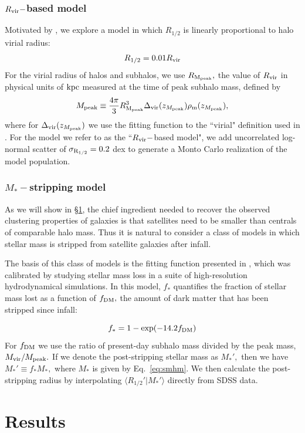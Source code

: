 \documentclass[usenatbib,usegraphicx,letterpaper]{mn2e}
\newcommand{\beq}{\begin{equation}}
\newcommand{\eeq}{\end{equation}}
\newcommand{\rhalf}{R_{1/2}}
\newcommand{\sigmarhalf}{\sigma_{\rm R_{1/2}}}
\newcommand{\mstar}{M_{\ast}}
\newcommand{\mpeak}{M_{\rm peak}}
\newcommand{\zpeak}{z_{M_{\rm peak}}}
\newcommand{\rvir}{R_{\rm vir}}
\newcommand{\rmpeak}{R_{\rm M_{peak}}}
\newcommand{\kpc}{{\rm kpc}}
\begin{document}
\subsubsection{$\rvir-$based model}
\label{subsubsec:rvirmodel}

Motivated by \citet{kravtsov13}, we explore a model in which $\rhalf$ is linearly proportional to halo virial radius:
\beq
\label{eq:fiducial_model}
\rhalf = 0.01\rvir
\eeq
For the virial radius of halos and subhalos, we use $\rmpeak,$ the value of $\rvir$ in physical units of $\kpc$ measured at the time of peak subhalo mass, defined by
\beq
\mpeak\equiv\frac{4\pi}{3}\rmpeak^{3}\Delta_{\rm vir}(\zpeak)\rho_{\rm m}(\zpeak),
\eeq
where for $\Delta_{\rm vir}(\zpeak)$ we use the fitting function to the ``virial" definition used in \citet{bryan_norman98}. For the model we refer to as the ``$\rvir-$based model", we add uncorrelated log-normal scatter of $\sigmarhalf=0.2$ dex to generate a Monto Carlo realization of the model population.

\subsubsection{$\mstar-$stripping model}
\label{subsubsec:strippingmodel}

As we will show in \S\ref{sec:results}, the chief ingredient needed to recover the observed clustering properties of galaxies is that satellites need to be smaller than centrals of comparable halo mass. Thus it is natural to consider a class of models in which stellar mass is stripped from satellite galaxies after infall.

The basis of this class of models is the fitting function presented in \citet{smith_etal16}, which was calibrated by studying stellar mass loss in a suite of high-resolution hydrodynamical simulations. In this model, $f_{\ast}$ quantifies the fraction of stellar mass lost as a function of $f_{\rm DM},$ the amount of dark matter that has been stripped since infall:

\beq
f_{\ast} = 1 - \exp(-14.2f_{\rm DM})
\eeq
For $f_{\rm DM}$ we use the ratio of present-day subhalo mass divided by the peak mass, $M_{\rm vir}/M_{\rm peak}.$ If we denote the post-stripping stellar mass as $M_{\ast}',$ then we have $M_{\ast}'\equiv f_{\ast}M_{\ast},$ where $M_{\ast}$ is given by Eq.~\ref{eq:smhm}. We then calculate the post-stripping radius by interpolating $\langle\rhalf'\vert\mstar'\rangle$ directly from SDSS data.

\section{Results}
\label{sec:results}
\end{document}
